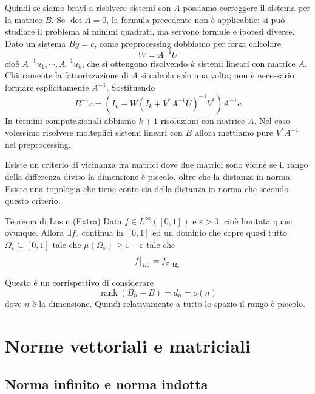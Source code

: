 \documentclass[a4paper]{article}
\begin{document}
Quindi se siamo bravi a risolvere sistemi con \(A\)
possiamo correggere il sistema per la matrice \(B\).
Se \(\det A = 0\), la formula precedente non è applicabile; si può studiare il problema ai minimi quadrati, ma servono formule e ipotesi diverse.
Dato un sistema \(By=c\), come preprocessing dobbiamo per forza calcolare
\[
    W = A^{-1}U
\]
cioè \(A^{-1}u_1, \cdots, A^{-1} u_{k}\),
che si ottengono risolvendo \(k\) sistemi lineari con matrice \(A\).
Chiaramente la fattorizzazione di \(A\) si calcola solo una volta; non è necessario formare esplicitamente \(A^{-1}\).
Sostituendo
\[
    B^{-1} c = (I_n - W(I_k + V^* A^{-1} U)^{-1}V^*)A^{-1} c
\]
In termini computazionali abbiamo \(k+1\) risoluzioni con matrice \(A\).
Nel caso volessimo risolvere molteplici sistemi lineari con \(B\)
allora mettiamo pure \(V^* A^{-1}\) nel preprocessing.

Esiste un criterio di vicinanza fra matrici dove due matrici sono vicine se
il rango della differenza diviso la dimensione è piccolo,
oltre che la distanza in norma. Esiste una topologia che tiene conto sia della distanza in
norma che secondo questo criterio.

\begin{snippettheorem}{Teorema di Lusin (Extra)}
    Data \(f \in L^\infty([0,1])\) e \(\varepsilon >0\),
    cioè limitata quasi ovunque. Allora
    \(\exists f_\varepsilon\) continua in \([0,1]\) ed un dominio che
    copre quasi tutto \(\Omega_\varepsilon \subseteq [0,1]\)
    tale che \(\mu(\Omega_\varepsilon) \geq 1-\varepsilon\) tale che
    \[
        \restr{f}{\Omega_\varepsilon} = \restr{f_\varepsilon}{\Omega_\varepsilon}
    \]
\end{snippettheorem}

Questo è un corrispettivo di considerare
\[
    \operatorname{rank}(B_n - B) = d_n = o(n)
\]
dove \(n\) è la dimensione.
Quindi relativamente a tutto lo spazio il rango è piccolo.

\pagebreak

\section{Norme vettoriali e matriciali}

\subsection{Norma infinito e norma indotta}
\end{document}
